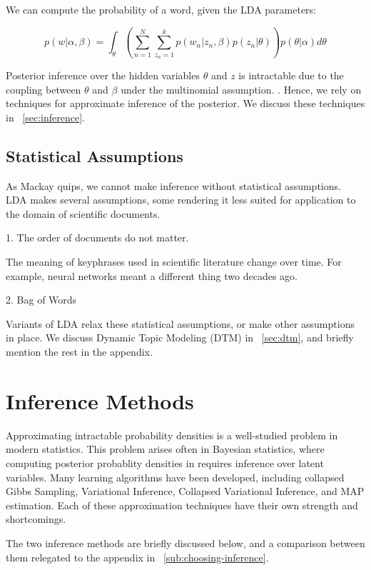 \documentclass[letterpaper]{article}
\begin{document}
We can compute the probability of a word, given the LDA parameters:

\begin{equation}
  p(w | \alpha, \beta) = \int_\theta \left( \sum_{n=1}^{N}
    \sum_{z_n = 1}^{k} p(w_n | z_n, \beta)p(z_n | \theta) \right)
  p(\theta | \alpha) d\theta
\end{equation}

Posterior inference over the hidden variables $\theta$ and $z$ is
intractable due to the coupling between $\theta$ and $\beta$ under the
multinomial assumption. \citep{blei2003latent}. Hence, we rely on
techniques for approximate inference of the posterior. We discuss these
techniques in ~\autoref{sec:inference}.

\subsection{Statistical Assumptions}
\label{subsec:statistical-assumptions}
As Mackay quips, we cannot make inference without statistical
assumptions. LDA makes several assumptions, some rendering it less
suited for application to the domain of scientific documents.

1. The order of documents do not matter.

The meaning of keyphrases used in scientific literature change over
time. For example, neural networks meant a different thing two decades
ago.

2. Bag of Words

Variants of LDA relax these statistical assumptions, or make other
assumptions in place. We discuss Dynamic Topic Modeling (DTM) in
~\autoref{sec:dtm}, and briefly mention the rest in the appendix.

\section{Inference Methods}
\label{sec:inference}
Approximating intractable probability densities is a well-studied
problem in modern statistics. This problem arises often in Bayesian
statistics, where computing posterior probablity densities in requires
inference over latent variables. Many learning algorithms have been
developed, including collapsed Gibbs Sampling, Variational Inference,
Collapsed Variational Inference, and MAP estimation. Each of these
approximation techniques have their own strength and shortcomings.

The two inference methods are briefly discussed below, and a
comparison between them relegated to the appendix in
~\autoref{sub:choosing-inference}.
\end{document}
